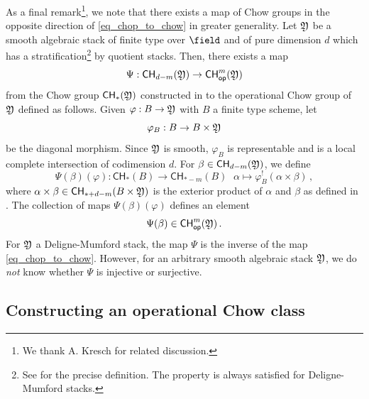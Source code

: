 \documentclass[a4paper,12pt]{article} %
\theoremstyle{definition}
\theoremstyle{plain}%
\renewcommand{\phi}{\varphi}
\newcommand{\Chow}{\mathsf{CH}}
\newcommand{\CHop}{\Chow_{\mathsf{op}}}
\begin{document}
As a final remark{\footnote{We thank A. Kresch for related
discussion.}}, we note that there exists a map of Chow groups in the opposite direction of \eqref{eq_chop_to_chow} in greater generality. Let $\frak Y$ be a smooth algebraic stack of finite type over $\field$ and of pure dimension $d$
which has a stratification\footnote{See \cite{Kresch1999Cycle-groups-fo} for the precise definition. The property is always satisfied for Deligne-Mumford stacks.}
by quotient stacks. Then, there exists a map
\[\Psi: \Chow_{d-m}(\frak Y) \to \CHop^m(\frak Y)\]
from the Chow group $\Chow_*(\frak Y)$ constructed in \cite{Kresch1999Cycle-groups-fo} to the operational Chow group of $\frak Y$ 
defined as follows. Given $\phi : B \to \frak Y$ with $B$ a finite type scheme, let $$\phi_B : B \to B \times \frak Y$$ be 
the diagonal morphism. Since $\frak Y$ is smooth, $\phi_B$
is representable and  is a local complete intersection of codimension $d$. For $\beta \in \Chow_{d-m}(\frak Y)$, we define
\begin{equation*}
    \Psi(\beta)(\phi) : \Chow_*(B) \to \Chow_{*-m}(B)\, \ \
    \alpha \mapsto \phi_B^!(\alpha \times \beta)\, ,
\end{equation*}
where $\alpha \times \beta \in \Chow_{*+d-m}(B \times \frak Y)$ is the exterior product of $\alpha$ and $\beta$ as defined in \cite[Section 3.2]{Kresch1999Cycle-groups-fo}. The collection of maps $\Psi(\beta)(\phi)$ defines an element $$\Psi(\beta) \in \CHop^m(\frak Y)\, .$$
For $\frak Y$ a Deligne-Mumford stack, the map $\Psi$ is the inverse of the map \eqref{eq_chop_to_chow}. 
However, for an arbitrary smooth algebraic stack $\frak Y$,
we do {\em not} know whether  $\Psi$ is injective or surjective.

\subsection{Constructing an operational Chow class} \label{sec:constructing_chow_class}
\end{document}
